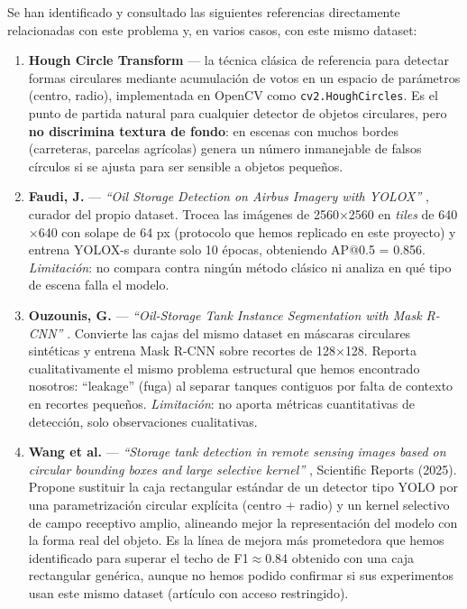 \documentclass[11pt,a4paper]{article}
\begin{document}
Se han identificado y consultado las siguientes referencias directamente relacionadas
con este problema y, en varios casos, con este mismo dataset:

\begin{enumerate}
    \item \textbf{Hough Circle Transform} \cite{duda1972hough} --- la técnica clásica
    de referencia para detectar formas circulares mediante acumulación de votos en un
    espacio de parámetros (centro, radio), implementada en OpenCV como
    \texttt{cv2.HoughCircles}. Es el punto de partida natural para cualquier detector
    de objetos circulares, pero \textbf{no discrimina textura de fondo}: en escenas
    con muchos bordes (carreteras, parcelas agrícolas) genera un número inmanejable de
    falsos círculos si se ajusta para ser sensible a objetos pequeños.

    \item \textbf{Faudi, J.} --- \emph{``Oil Storage Detection on Airbus Imagery with
    YOLOX''} \cite{faudi_yolox}, curador del propio dataset. Trocea las imágenes de
    2560$\times$2560 en \emph{tiles} de 640$\times$640 con solape de 64 px (protocolo
    que hemos replicado en este proyecto) y entrena YOLOX-s durante solo 10 épocas,
    obteniendo AP@0.5 = 0.856. \emph{Limitación}: no compara contra ningún método
    clásico ni analiza en qué tipo de escena falla el modelo.

    \item \textbf{Ouzounis, G.} --- \emph{``Oil-Storage Tank Instance Segmentation
    with Mask R-CNN''} \cite{ouzounis_maskrcnn}. Convierte las cajas del mismo dataset
    en máscaras circulares sintéticas y entrena Mask R-CNN sobre recortes de
    128$\times$128. Reporta cualitativamente el mismo problema estructural que hemos
    encontrado nosotros: ``leakage'' (fuga) al separar tanques contiguos por falta de
    contexto en recortes pequeños. \emph{Limitación}: no aporta métricas cuantitativas
    de detección, solo observaciones cualitativas.

    \item \textbf{Wang et al.} --- \emph{``Storage tank detection in remote sensing
    images based on circular bounding boxes and large selective kernel''}
    \cite{wang2025circular}, Scientific Reports (2025). Propone sustituir la caja
    rectangular estándar de un detector tipo YOLO por una parametrización circular
    explícita (centro + radio) y un kernel selectivo de campo receptivo amplio,
    alineando mejor la representación del modelo con la forma real del objeto. Es la
    línea de mejora más prometedora que hemos identificado para superar el techo de
    F1$\approx$0.84 obtenido con una caja rectangular genérica, aunque no hemos podido
    confirmar si sus experimentos usan este mismo dataset (artículo con acceso
    restringido).


\end{enumerate}
\end{document}
